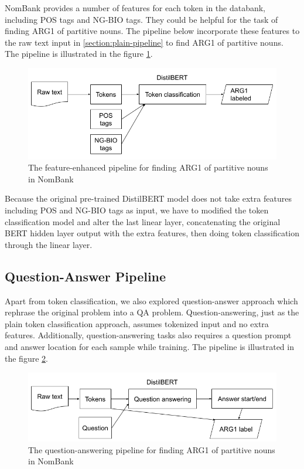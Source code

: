 \documentclass[11pt]{article}
\begin{document}
NomBank provides a number of features for each token in the databank, including POS tags and NG-BIO tags. They could be helpful for the task of finding ARG1 of partitive nouns. The pipeline below incorporate these features to the raw text input in \ref{section:plain-pipeline} to find ARG1 of partitive nouns. The pipeline is illustrated in the figure \ref{fig:enhanced-arg1-pipeline}.

\begin{figure}[h]
  \centering
  \includegraphics[width=\linewidth]{assets/enhanced-arg1-pipeline.png}
  \caption{The feature-enhanced pipeline for finding ARG1 of partitive nouns in NomBank}
  \label{fig:enhanced-arg1-pipeline}
\end{figure}

Because the original pre-trained DistilBERT model does not take extra features including POS and NG-BIO tags as input, we have to modified the token classification model and alter the last linear layer, concatenating the original BERT hidden layer output with the extra features, then doing token classification through the linear layer.

\subsection{Question-Answer Pipeline}

Apart from token classification, we also explored question-answer approach which rephrase the original problem into a QA problem. Question-answering, just as the plain token classification approach, assumes tokenized input and no extra features. Additionally, question-answering tasks also requires a question prompt and answer location for each sample while training. The pipeline is illustrated in the figure \ref{fig:qa-arg1-pipeline}.

\begin{figure}[h]
  \centering
  \includegraphics[width=\linewidth]{assets/qa-arg1-pipeline.png}
  \caption{The question-answering pipeline for finding ARG1 of partitive nouns in NomBank}
  \label{fig:qa-arg1-pipeline}
\end{figure}
\end{document}
